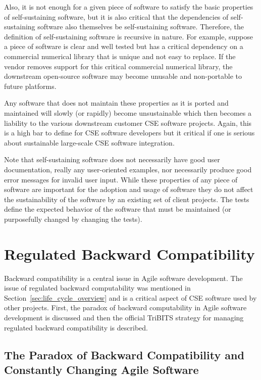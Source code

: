 \documentclass[11pt]{SANDreport}
\begin{document}
Also, it is not enough for a given piece of software to satisfy the
basic properties of self-sustaining software, but it is also critical
that the dependencies of self-sustaining software also themselves be
self-sustaining software. Therefore, the definition of self-sustaining
software is recursive in nature.  For example, suppose a piece of
software is clear and well tested but has a critical dependency on a
commercial numerical library that is unique and not easy to replace.
If the vendor removes support for this critical commercial numerical
library, the downstream open-source software may become unusable and
non-portable to future platforms.

Any software that does not maintain these properties as it is ported
and maintained will slowly (or rapidly) become unsustainable which
then becomes a liability to the various downstream customer CSE
software projects.  Again, this is a high bar to define for CSE
software developers but it critical if one is serious about
sustainable large-scale CSE software integration.

Note that self-sustaining software does not necessarily have good user
documentation, really any user-oriented examples, nor necessarily
produce good error messages for invalid user input.  While these
properties of any piece of software are important for the adoption and
usage of software they do not affect the sustainability of the software
by an existing set of client projects.  The tests define the expected
behavior of the software that must be maintained (or purposefully
changed by changing the tests).


%
{}\section{Regulated Backward Compatibility}
\label{sec:regulated_backard_compatibility}
%

Backward compatibility is a central issue in Agile software
development.  The issue of regulated backward computability was
mentioned in Section~\ref{sec:life_cycle_overview} and is a critical
aspect of CSE software used by other projects.  First, the paradox of
backward computability in Agile software development is discussed and
then the official TriBITS strategy for managing regulated backward
compatibility is described.


%
{}\subsection{The Paradox of Backward Compatibility and Constantly
Changing Agile Software}
\label{sec:paradox_of_back_compat_agile}
%
\end{document}
